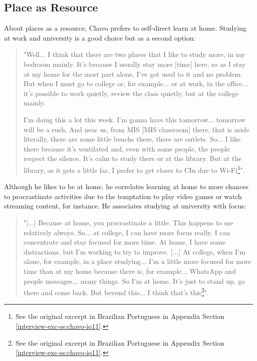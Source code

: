 \subsection{Place as Resource}
\label{results-ss:place}

About places as a resource, Chavo prefers to self-direct learn at home. Studying at work and university is a good choice but as a second option:
\begin{quote}
    "Well... I think that there are two places that I like to study more, in my bedroom mainly. It's because I usually stay more [time] here, so as I stay at my home for the most part alone, I've got used to it and no problem. But when I must go to college or, for example... or at work, in the office... it's possible to work quietly, review the class quietly, but at the college mainly.

    I'm doing this a lot this week. I'm gonna have this tomorrow... tomorrow will be a rush. And near us, from \gls{MIS} [\acrlong{MIS} classroom] there, that is aside literally, there are some little benchs there, there are outlets. So... I like there because it's ventilated and, even with some people, the people respect the silence. It's calm to study there or at the library. But at the library, as it gets a little far, I prefer to get closer to \gls{CIn} due to Wi-Fi\footnote{See the original excerpt in Brazilian Portuguese in Appendix Section \ref{interview-exc-ss:chavo-iq11}.}".    
\end{quote}
Although he likes to be at home, he correlates learning at home to more chances to procrastinate activities due to the temptation to play video games or watch streaming content, for instance. He associates studying at university with focus:
\begin{quote}
    "[...] Because at home, you procrastinate a little. This happens to me relatively always. So... at college, I can have more focus really. I can concentrate and stay focused for more time. At home, I have some distractions, but I'm working to try to improve. [...] At college, when I'm alone, for example, in a place studying... I'm a little more focused for more time than at my home because there is, for example... WhatsApp and people messages... many things. So I'm at home. It's just to stand up, go there and come back. But beyond this... I think that's this\footnote{See the original excerpt in Brazilian Portuguese in Appendix Section \ref{interview-exc-ss:chavo-iq11}.}".
\end{quote}

